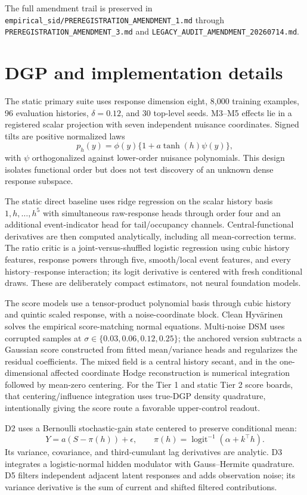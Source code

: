 \documentclass[11pt]{article}
\newcommand{\artifact}[1]{\nolinkurl{#1}}
\begin{document}
The full amendment trail is preserved in
\artifact{empirical_sid/PREREGISTRATION_AMENDMENT_1.md} through
\artifact{PREREGISTRATION_AMENDMENT_3.md} and
\artifact{LEGACY_AUDIT_AMENDMENT_20260714.md}.

\section{DGP and implementation details}

The static primary suite uses response dimension eight, 8,000 training examples,
96 evaluation histories, $\delta=0.12$, and 30 top-level seeds.  M3--M5 effects lie
in a registered scalar projection with seven independent nuisance coordinates.
Signed tilts are positive normalized laws
\[
  p_h(y)=\phi(y)\{1+a\tanh(h)\psi(y)\},
\]
with $\psi$ orthogonalized against lower-order nuisance polynomials.  This design
isolates functional order but does not test discovery of an unknown dense response
subspace.

The static direct baseline uses ridge regression on the scalar history basis
$1,h,\ldots,h^5$ with simultaneous raw-response heads through order four and an
additional event-indicator head for tail/occupancy channels.  Central-functional
derivatives are then computed analytically, including all mean-correction terms.
The ratio critic is a joint-versus-shuffled logistic regression using cubic history
features, response powers through five, smooth/local event features, and every
history--response interaction; its logit derivative is centered with fresh
conditional draws.  These are deliberately compact estimators, not neural
foundation models.

The score models use a tensor-product polynomial basis through cubic history and
quintic scaled response, with a noise-coordinate block.  Clean Hyv\"arinen solves
the empirical score-matching normal equations.  Multi-noise DSM uses corrupted
samples at $\sigma\in\{0.03,0.06,0.12,0.25\}$; the anchored version subtracts a
Gaussian score constructed from fitted mean/variance heads and regularizes the
residual coefficients.  The mixed field is a central history secant, and in the
one-dimensional affected coordinate Hodge reconstruction is numerical integration
followed by mean-zero centering.  For the Tier 1 and static Tier 2 score boards,
that centering/influence integration uses true-DGP density quadrature, intentionally
giving the score route a favorable upper-control readout.

D2 uses a Bernoulli stochastic-gain state centered to preserve conditional mean:
\[
  Y=a(S-\pi(h))+\epsilon,
  \qquad \pi(h)=\operatorname{logit}^{-1}(\alpha+k^\top h).
\]
Its variance, covariance, and third-cumulant lag derivatives are analytic.  D3
integrates a logistic-normal hidden modulator with Gauss--Hermite quadrature.  D5
filters independent adjacent latent responses and adds observation noise; its
variance derivative is the sum of current and shifted filtered contributions.
\end{document}
